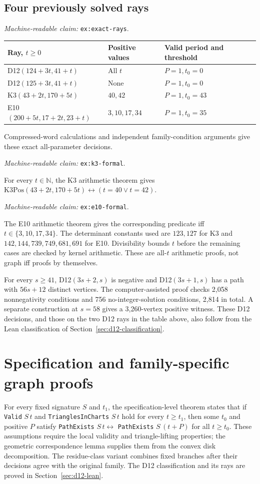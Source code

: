 \documentclass[11pt]{amsart}
\newcommand{\N}{\mathbb N}
\newcommand{\record}[1]{\nolinkurl{#1}}
\newcommand{\claimid}[1]{\par\nopagebreak\noindent\textit{Machine-readable claim:} \record{#1}.\par}
\theoremstyle{definition}\newtheorem{definition}{Definition}
\begin{document}
\subsection{Four previously solved rays}\label{ex:exact-rays}
\claimid{ex:exact-rays}
\begin{center}
\begin{tabular}{lll}\toprule
Ray, $t\ge0$ & Positive values & Valid period and threshold\\\midrule
D12$(124+3t,41+t)$ & All $t$ & $P=1,t_0=0$\\
D12$(125+3t,41+t)$ & None & $P=1,t_0=0$\\
K3$(43+2t,170+5t)$ & $40,42$ & $P=1,t_0=43$\\
E10$(200+5t,17+2t,23+t)$ & $3,10,17,34$ & $P=1,t_0=35$\\\bottomrule
\end{tabular}
\end{center}
Compressed-word calculations and independent family-condition
arguments give these exact all-parameter decisions.
\label{ex:k3-formal}\claimid{ex:k3-formal}
For every $t\in\N$, the K3 arithmetic theorem gives
$\mathrm{K3Pos}(43+2t,170+5t)\leftrightarrow(t=40\lor t=42)$.
\label{ex:e10-formal}\claimid{ex:e10-formal}
The E10 arithmetic theorem gives the corresponding predicate
iff $t\in\{3,10,17,34\}$. The determinant constants used are
$123,127$ for K3 and $142,144,739,749,681,691$ for E10. Divisibility
bounds $t$ before the remaining cases are checked by kernel arithmetic.
These are all-$t$ arithmetic proofs, not graph iff proofs by themselves.

For every $s\ge41$, D12$(3s+2,s)$ is negative and
D12$(3s+1,s)$ has a path with $56s+12$ distinct vertices. The
computer-assisted proof checks 2,058 nonnegativity conditions and
756 no-integer-solution conditions, 2,814 in total. A separate
construction at $s=58$ gives a 3,260-vertex positive witness.
These D12 decisions, and those on the two D12 rays in the table
above, also follow from the Lean classification of
Section~\ref{sec:d12-classification}.

\section{Specification and family-specific graph proofs}\label{sec:formal}
For every fixed signature $S$ and $t_1$, the specification-level
theorem states that if \record{Valid} $S\,t$ and
\record{TrianglesInCharts} $S\,t$ hold for every $t\ge t_1$, then
some $t_0$ and positive $P$ satisfy
\record{PathExists} $S\,t\leftrightarrow$
\record{PathExists} $S\,(t+P)$ for all $t\ge t_0$.
These assumptions require the local validity and triangle-lifting
properties; the geometric correspondence lemma supplies them from
the convex disk decomposition. The residue-class variant combines
fixed branches after their decisions agree with the original family.
The D12 classification and its rays are proved in
Section~\ref{sec:d12-lean}.
\end{document}
